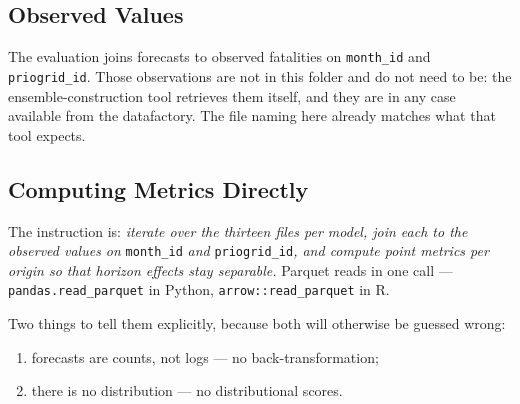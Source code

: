 \subsection*{Observed Values}

The evaluation joins forecasts to observed fatalities on \texttt{month\_id} and
\texttt{priogrid\_id}. Those observations are not in this folder and do not need to be: the
ensemble-construction tool retrieves them itself, and they are in any case available from the
datafactory. The file naming here already matches what that tool expects.

\subsection*{Computing Metrics Directly}

The instruction is: \textit{iterate over the thirteen files per model, join each to the observed
values on} \texttt{month\_id} \textit{and} \texttt{priogrid\_id}\textit{, and compute point metrics
per origin so that horizon effects stay separable.} Parquet reads in one call ---
\texttt{pandas.read\_parquet} in Python, \texttt{arrow::read\_parquet} in R.

Two things to tell them explicitly, because both will otherwise be guessed wrong:

\begin{enumerate}
    \item forecasts are counts, not logs --- no back-transformation;
    \item there is no distribution --- no distributional scores.
\end{enumerate}
